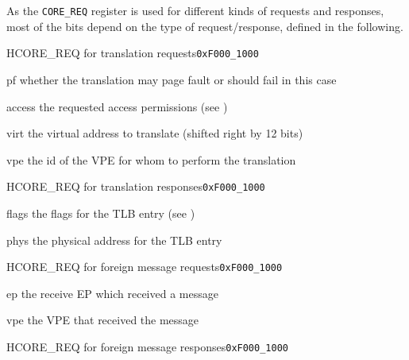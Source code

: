\noindent As the \texttt{CORE\_REQ} register is used for different kinds of requests and responses,
most of the bits depend on the type of request/response, defined in the following.

\begin{register}{H}{CORE\_REQ for translation requests}{\texttt{0xF000\_1000}}
  \regnewline%
  \begin{regdesc}\begin{reglist}
    \item[pf] whether the translation may page fault or should fail in this case
    \item[access] the requested access permissions (see )
    \item[virt] the virtual address to translate (shifted right by 12 bits)
    \item[vpe] the id of the VPE for whom to perform the translation
  \end{reglist}\end{regdesc}
\end{register}

\begin{register}{H}{CORE\_REQ for translation responses}{\texttt{0xF000\_1000}}
  \regnewline%
  \begin{regdesc}\begin{reglist}
    \item[flags] the flags for the TLB entry (see )
    \item[phys] the physical address for the TLB entry
  \end{reglist}\end{regdesc}
\end{register}
\extend{}

\begin{register}{H}{CORE\_REQ for foreign message requests}{\texttt{0xF000\_1000}}
  \regnewline%
  \begin{regdesc}\begin{reglist}
    \item[ep] the receive EP which received a message
    \item[vpe] the VPE that received the message
  \end{reglist}\end{regdesc}
\end{register}

\begin{register}{H}{CORE\_REQ for foreign message responses}{\texttt{0xF000\_1000}}
  \regnewline%
\end{register}
\extend{}
